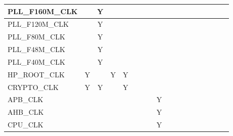 \documentclass[main\_\_EN.tex]{subfiles}
\begin{document}
\begin{landscape}
\begin{tiny}
\begin{longtable}[c]{|m{1.7cm}|c|c|c|c|c|c|c|C{1.5cm}|c|c|c|c|c|c|c|c|c| }
    PLL\_F160M\_CLK &   & Y &  &   &   &   &   &  &   &   &   &   &   &   &   &   &   \\ \hline
    PLL\_F120M\_CLK &   & Y &  &   &   &   &   &  &   &   &   &   &   &   &   &   &    \\ \hline
    PLL\_F80M\_CLK &   & Y &  &   &   &   &   &  &   &   &   &   &   &   &   &   &    \\ \hline
    PLL\_F48M\_CLK &   & Y &   &   &   &   &   &  &   &   &   &   &   &   &   &   &   \\ \hline
    PLL\_F40M\_CLK &   & Y &  &   &   &   &   &  &   &   &   &   &   &   &   &   &    \\ \hline
    HP\_ROOT\_CLK & Y &  & Y & Y &   &   &   &  &   &   &   &   &   &   &   &   &    \\ \hline
    CRYPTO\_CLK & Y & Y &  & Y &   &   &   &  &   &   &   &   &   &   &   &   &    \\ \hline
    APB\_CLK &   &   &   &   &   &   &   &   Y &   &   &   &   &   &   &   &  &  \\ \hline
    AHB\_CLK &   &   &   &   &   &   &   &   Y &   &   &   &   &   &   &   &  &  \\ \hline
    CPU\_CLK &   &   &   &   &   &   &   &   Y &   &   &   &   &   &   &   &  &  \\ \hline
\end{longtable}
\newpage


\end{tiny}
\end{landscape}
\end{document}
